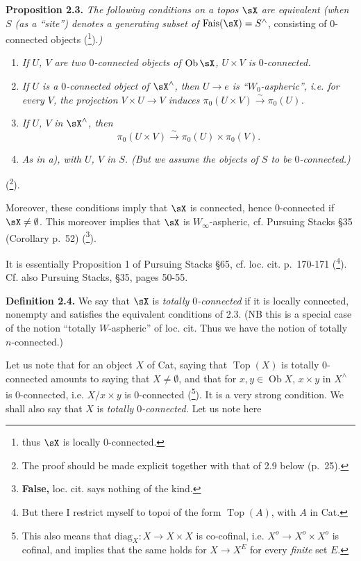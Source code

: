 \noindent\textbf{Proposition 2.3.} \textit{The following conditions on a topos $\sX$ are equivalent (when $S$ (as a ``site'') denotes a generating subset of} $\mathrm{Fais}(\sX) = S^{\wedge}$, consisting of 0-connected objects (\footnote[23]{thus $\sX$ is locally 0-connected.}).\textit{)}
\begin{enumerate}[label={},leftmargin=3em]
\item[\textit{a)}] \textit{If $U$, $V$ are two $0$-connected objects of $\operatorname{Ob} \sX$, $U \times V$ is $0$-connected.}
\item[\textit{b)}] \textit{If $U$ is a $0$-connected object of $\sX^{\wedge}$, then $U \longrightarrow e$ is ``$W_0$-aspheric'', i.e. for every $V$, the projection $V \times U \longrightarrow V$ induces $\pi_0(U \times V) \xrightarrow{\sim} \pi_0(U)$.}
\item[\textit{c)}] \textit{If $U$, $V$} \textit{in $\sX^{\wedge}$, then}
\[
\pi_0(U \times V) \xrightarrow{\sim} \pi_0(U) \times \pi_0(V).
\]
\item[\textit{d)}] \textit{As in a), with $U$, $V$ in $S$. (But we assume the objects of $S$ to be $0$-connected.)}
\end{enumerate}
\noindent(\footnote[24]{The proof should be made explicit together with that of 2.9 below (p.~25).}). %


\noindent Moreover, these conditions imply that $\sX$ is connected, hence 0-connected if $\sX \neq \emptyset$. This moreover implies that $\sX$ is $W_{\infty}$-aspheric, cf. Pursuing Stacks §35 (Corollary p.~52) (\footnote[25]{\textbf{False,} loc. cit. says nothing of the kind.}).

It is essentially Proposition 1 of Pursuing Stacks §65, cf. loc. cit. p.~170-171 (\footnote[26]{But there I restrict myself to topoi of the form $\operatorname{Top}(A)$, with $A$ in Cat.}). Cf. also Pursuing Stacks, §35, pages 50-55.


\noindent\textbf{Definition 2.4.} We say that $\sX$ is \textit{totally $0$-connected} if it is locally connected, nonempty and satisfies the equivalent conditions of 2.3. (NB this is a special case of the notion ``totally $W$-aspheric'' of loc. cit. Thus we have the notion of totally $n$-connected.)

Let us note that for an object $X$ of Cat, saying that $\operatorname{Top}(X)$ is totally 0-connected amounts to saying that $X \neq \emptyset$, and that for $x, y \in \operatorname{Ob} X$, $x \times y$ in $X^{\wedge}$ is 0-connected, i.e. $X/x \times y$ is 0-connected (\footnote[27]{This also means that $\mathrm{diag}_X : X \longrightarrow X \times X$ is co-cofinal, i.e. $X^o \longrightarrow X^o \times X^o$ is cofinal, and implies that the same holds for $X \longrightarrow X^E$ for every \textit{finite} set $E$.}). It is a very strong condition. We shall also say that $X$ is \textit{totally $0$-connected.} Let us note here

